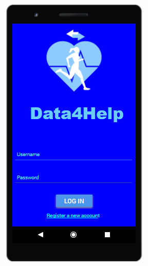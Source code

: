 \begin{figure}[H]
\centering
\begin{minipage}{.5\textwidth}
  \centering
  \includegraphics[width=0.89\linewidth]{resources/Screen/Individuallogin.png}
  \label{fig:App Login}
\end{minipage}%
\begin{minipage}{.5\textwidth}
  \centering

\end{minipage}
\end{figure}
